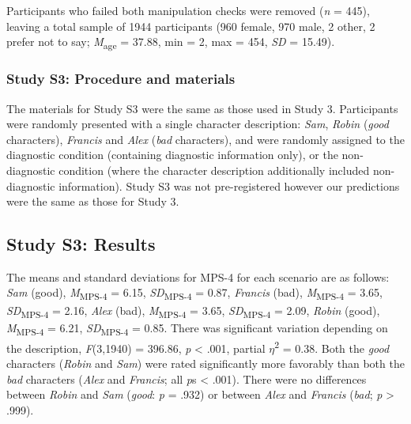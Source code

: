 \documentclass[
  man,floatsintext]{apa6}
\begin{document}
Participants who failed both manipulation checks were removed (\emph{n} = 445), leaving a total sample of 1944 participants (960 female, 970 male, 2 other, 2 prefer not to say; \emph{M}\textsubscript{age} = 37.88, min = 2, max = 454, \emph{SD} = 15.49).

\subsubsection{Study S3: Procedure and materials}\label{study-s3-procedure-and-materials}

The materials for Study S3 were the same as those used in Study 3. Participants were randomly presented with a single character description: \emph{Sam}, \emph{Robin} (\emph{good} characters), \emph{Francis} and \emph{Alex} (\emph{bad} characters), and were randomly assigned to the diagnostic condition (containing diagnostic information only), or the non-diagnostic condition (where the character description additionally included non-diagnostic information). Study S3 was not pre-registered however our predictions were the same as those for Study 3.

\subsection{Study S3: Results}\label{study-s3-results}

The means and standard deviations for MPS-4 for each scenario are as follows:
\emph{Sam} (good),
\emph{M}\textsubscript{MPS-4} = 6.15, \emph{SD}\textsubscript{MPS-4} = 0.87,
\emph{Francis} (bad),
\emph{M}\textsubscript{MPS-4} = 3.65, \emph{SD}\textsubscript{MPS-4} = 2.16,
\emph{Alex} (bad),
\emph{M}\textsubscript{MPS-4} = 3.65, \emph{SD}\textsubscript{MPS-4} = 2.09,
\emph{Robin} (good),
\emph{M}\textsubscript{MPS-4} = 6.21, \emph{SD}\textsubscript{MPS-4} = 0.85. There was significant variation depending on the description, \emph{F}(3,1940) = 396.86, \emph{p} \textless{} .001, partial \(\eta\)\textsuperscript{2} = 0.38. Both the \emph{good} characters (\emph{Robin} and \emph{Sam}) were rated significantly more favorably than both the \emph{bad} characters (\emph{Alex} and \emph{Francis}; all \emph{p}s \textless{} .001). There were no differences between \emph{Robin} and \emph{Sam} (\emph{good}: \emph{p} = .932) or between \emph{Alex} and \emph{Francis} (\emph{bad}; \emph{p} \textgreater{} .999).
\end{document}
